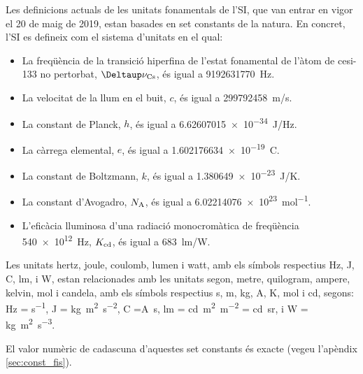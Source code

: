 Les definicions actuals de les unitats fonamentals de l'SI, que van entrar en vigor el 20 de maig de 2019, estan basades en set constants de la natura. En concret, l'SI es defineix com el  sistema d'unitats en el qual:
\begin{itemize}

\item La freqüència de la transició hiperfina de l'estat fonamental de l'àtom de cesi-133 no pertorbat, $\Deltaup\nu\ped{Cs}$, és igual a \qty{9 192 631 770}{Hz}.
\item La velocitat de la llum en el buit, $c$, és igual a \qty{299792458}{m/s}.
\item La constant de Planck, $h$, és igual a \qty{6,62607015 e-34}{J/Hz}.
\item La càrrega elemental, $e$, és igual a \qty{1,602176634 e-19}{C}.
\item La constant de Boltzmann, $k$, és igual a \qty{1,380649e-23}{J/K}.
\item La constant d'Avogadro, $N_\mathrm{A}$, és igual a \qty{6,02214076 e23}{mol^{-1}}.
\item L'eficàcia lluminosa d'una radiació monocromàtica de freqüència \qty{540e12}{Hz},  $K_\mathrm{cd}$, és igual a \qty{683}{lm/W}.
\end{itemize}
 
 


Les unitats  hertz, joule, coulomb, lumen i watt, amb els símbols respectius Hz, J, C, lm, i W, estan relacionades amb les unitats segon, metre, quilogram, ampere, kelvin, mol i candela, amb els símbols respectius s, m, kg, A, K, mol i cd, segons:  Hz = \unit{s^{-1}}, J = \unit{kg.m^2.s^{-2}}, C =\unit{A.s}, lm = \unit{cd.m^2.m^{-2}} = \unit{cd.sr}, i W = \unit{kg.m^2.s^{-3}}.

El valor numèric de cadascuna d'aquestes set constants és exacte (vegeu l'apèndix \vref{sec:const_fis}).

